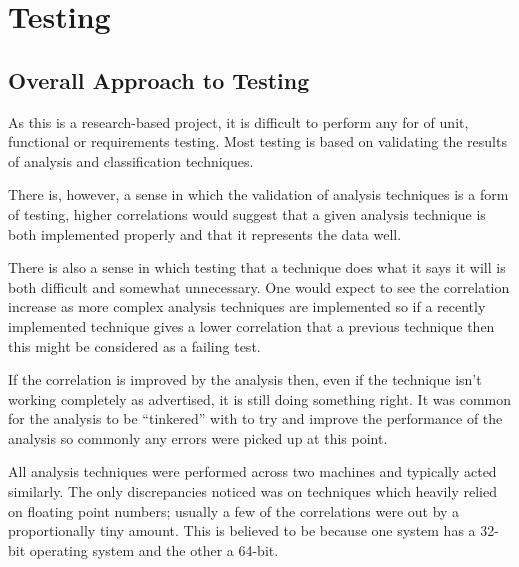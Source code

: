 \chapter{Testing}



\section{Overall Approach to Testing}
As this is a research-based project, it is difficult to perform any for of unit, functional or 
requirements testing. Most testing is based on validating the results of analysis and 
classification techniques.

There is, however, a sense in which the validation of analysis techniques is a form of testing,
higher correlations would suggest that a given analysis technique is both implemented properly and
that it represents the data well.

There is also a sense in which testing that a technique does what it says it will is both 
difficult and somewhat unnecessary. One would expect to see the correlation increase as more
complex analysis techniques are implemented so if a recently implemented technique gives a lower
correlation that a previous technique then this might be considered as a failing test.

If the correlation is improved by the analysis then, even if the technique isn't working 
completely as advertised, it is still doing something right. It was common for the analysis to be
``tinkered'' with to try and improve the performance of the analysis so commonly any errors were
picked up at this point.

All analysis techniques were performed across two machines and typically acted similarly. The only
discrepancies noticed was on techniques which heavily relied on floating point numbers; usually a
few of the correlations were out by a proportionally tiny amount. This is believed to be because 
one system has a 32-bit operating system and the other a 64-bit.


